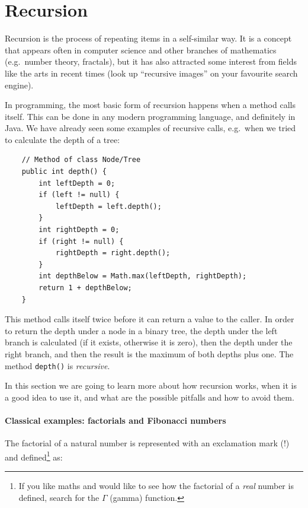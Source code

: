 \section{Recursion}
\label{sec:recursion}

Recursion is the process of repeating items in a self-similar way. It
is a concept that appears often in computer science and other branches
of mathematics (e.g.~number theory, fractals), but it has also
attracted some interest from fields like the arts in recent times
(look up ``recursive images'' on your favourite search engine). 

In programming, the most basic form of recursion happens when a method
calls itself. This can be done in any modern programming language, and
definitely in Java. We have already seen some examples of recursive
calls, e.g.~when we tried to calculate the depth of a tree: 

\begin{verbatim}
    // Method of class Node/Tree
    public int depth() {
        int leftDepth = 0;
        if (left != null) {
            leftDepth = left.depth();
        }
        int rightDepth = 0;
        if (right != null) {
            rightDepth = right.depth();
        }
        int depthBelow = Math.max(leftDepth, rightDepth);
        return 1 + depthBelow;
    }
\end{verbatim}

This method calls itself twice before it can return a value to the
caller. In order to return the depth under a node in a binary tree,
the depth under the left branch is calculated (if it exists, otherwise
it is zero), then the depth under the right branch, and then the
result is the maximum of both depths plus one. The method
\verb+depth()+ is \emph{recursive}. 

In this section we are going to
learn more about how recursion works, when it is a good idea to use
it, and what are the possible pitfalls and how to avoid them. 

\paragraph{Classical examples: factorials and Fibonacci numbers}
\label{sec:class-exampl-fact}

The factorial of a natural number is represented with an exclamation
mark (!) and defined\footnote{If you like maths and would like to see
  how the factorial of a \emph{real} number is defined, search for the
  $\Gamma$ (gamma) function.} as:  

